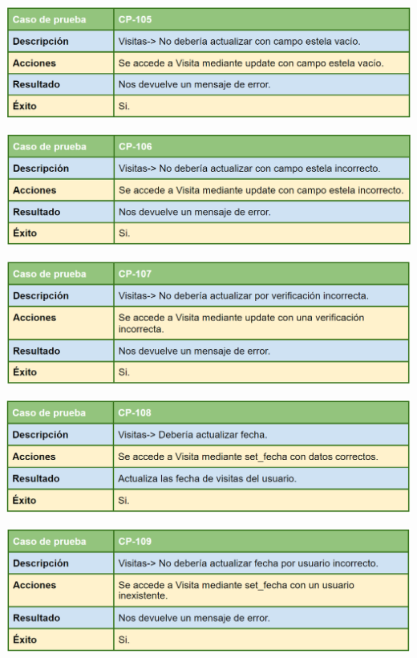 \bigskip

\includegraphics[width=\textwidth]{img/cap7/cp-105.png}

\bigskip

\includegraphics[width=\textwidth]{img/cap7/cp-106.png}

\bigskip

\includegraphics[width=\textwidth]{img/cap7/cp-107.png}

\bigskip

\includegraphics[width=\textwidth]{img/cap7/cp-108.png}

\bigskip

\includegraphics[width=\textwidth]{img/cap7/cp-109.png}

